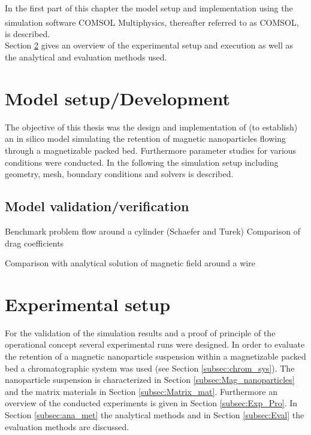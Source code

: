 In the first part of this chapter the model setup and implementation using the simulation software COMSOL Multiphysics\textsuperscript{\textregistered}, thereafter referred to as COMSOL, is described.\\
Section \ref{sec:Exp_setup} gives an overview of the experimental setup and execution as well as the analytical and evaluation methods used.  


\section{Model setup/Development}
\label{sec:Model_setup}
The objective of this thesis was the design and implementation of (to establish) an in silico model simulating the retention of magnetic nanoparticles flowing through a magnetizable packed bed. Furthermore parameter studies for various conditions were conducted. In the following the simulation setup including geometry, mesh, boundary conditions and solvers is described.    


\subsection{Model validation/verification}
\label{subsec:model_val}
Benchmark problem flow around a cylinder (Schaefer and Turek)
Comparison of drag coefficients

Comparison with analytical solution of magnetic field around a wire

\section{Experimental setup}
\label{sec:Exp_setup}
For the validation of the simulation results and a proof of principle of the operational concept several experimental runs were designed. In order to evaluate the retention of a magnetic nanoparticle suspension within a magnetizable packed bed a chromatographic system was used (see Section \ref{subsec:chrom_sys}). The nanoparticle suspension is characterized in Section \ref{subsec:Mag_nanoparticles} and the matrix materials in Section \ref{subsec:Matrix_mat}. Furthermore an overview of the conducted experiments is given in Section \ref{subsec:Exp_Pro}. In Section \ref{subsec:ana_met} the analytical methods and in Section \ref{subsec:Eval} the evaluation methods are discussed.    



